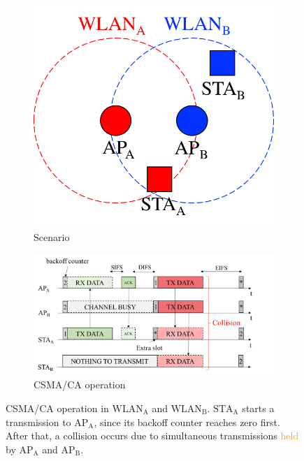 \documentclass[preprint,12pt]{elsarticle}
\begin{document}
\begin{figure}[h!]
	\centering		
	\begin{subfigure}[b]{0.25\textwidth}
		\includegraphics[width=\textwidth]{csma_a}
		\caption{Scenario}\label{fig:csma_a}
	\end{subfigure}
	\begin{subfigure}[b]{0.55\textwidth}
		\includegraphics[width=\textwidth]{csma_b}
		\caption{CSMA/CA operation}\label{fig:csma_b}
	\end{subfigure}
	\caption{CSMA/CA operation in $\text{WLAN}_{\text{A}}$ and $\text{WLAN}_{\text{B}}$. $\text{STA}_{\text{A}}$ starts a transmission to $\text{AP}_{\text{A}}$, since its backoff counter reaches zero first. After that, a collision occurs due to simultaneous transmissions \textcolor{orange}{held} by $\text{AP}_{\text{A}}$ and $\text{AP}_{\text{B}}$.}
	\label{fig:csma}
\end{figure}
\end{document}

